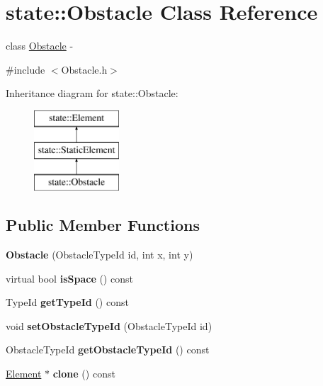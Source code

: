 \hypertarget{classstate_1_1_obstacle}{}\section{state\+:\+:Obstacle Class Reference}
\label{classstate_1_1_obstacle}


class \hyperlink{classstate_1_1_obstacle}{Obstacle} -\/  




{\ttfamily \#include $<$Obstacle.\+h$>$}

Inheritance diagram for state\+:\+:Obstacle\+:\begin{figure}[H]
\begin{center}
\leavevmode
\includegraphics[height=3.000000cm]{classstate_1_1_obstacle}
\end{center}
\end{figure}
\subsection*{Public Member Functions}
\begin{DoxyCompactItemize}
\item 
\mbox{\label{classstate_1_1_obstacle_a81d2e344286f1bedde13f90ef118379e}} 
{\bfseries Obstacle} (Obstacle\+Type\+Id id, int x, int y)
\item 
\mbox{\label{classstate_1_1_obstacle_a4d0fe501eb6d1227b889db3845cada77}} 
virtual bool {\bfseries is\+Space} () const
\item 
\mbox{\label{classstate_1_1_obstacle_acae46baf30f68bd3c9a8f3dd3ba347c7}} 
Type\+Id {\bfseries get\+Type\+Id} () const
\item 
\mbox{\label{classstate_1_1_obstacle_ab3e90122c3e034912c072a30a99fc483}} 
void {\bfseries set\+Obstacle\+Type\+Id} (Obstacle\+Type\+Id id)
\item 
\mbox{\label{classstate_1_1_obstacle_addedbd209e4690453db32de2e8ca95a7}} 
Obstacle\+Type\+Id {\bfseries get\+Obstacle\+Type\+Id} () const
\item 
\mbox{\label{classstate_1_1_obstacle_aedae2b6e04a1782212513bbb6eaf953d}} 
\hyperlink{classstate_1_1_element}{Element} $\ast$ {\bfseries clone} () const
\end{DoxyCompactItemize}
